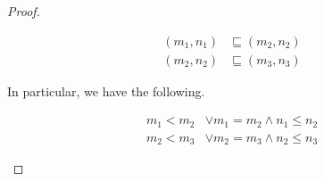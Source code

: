 \documentclass[letterpaper,11pt]{article}
\begin{document}
\begin{description}
\begin{proof}
\begin{description}
                \begin{align*}
                    (m_1,n_1)&\sqsubseteq(m_2,n_2)\\
                    (m_2,n_2)&\sqsubseteq(m_3,n_3)
                \end{align*}

                In particular, we have the following.

                \begin{align}
                    m_1<m_2&\lor m_1=m_2\land n_1\leq n_2
                    \label{eq:trans1}\\
                    m_2<m_3&\lor m_2=m_3\land n_2\leq n_3
                    \label{eq:trans2}
                \end{align}
        \end{description}
    \end{proof}
\end{description}
\end{document}
